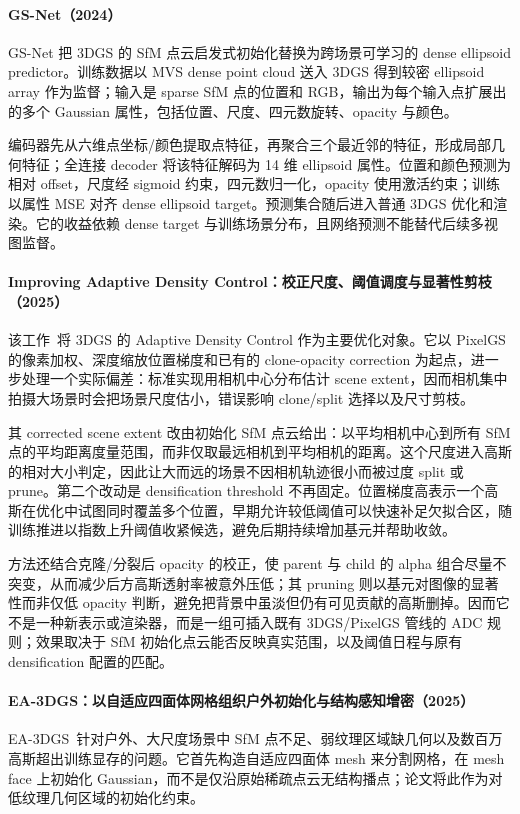 \paragraph{GS-Net（2024）\cite{2409_11307}}
GS-Net 把 3DGS 的 SfM 点云启发式初始化替换为跨场景可学习的 dense ellipsoid predictor。训练数据以 MVS dense point cloud 送入 3DGS 得到较密 ellipsoid array 作为监督；输入是 sparse SfM 点的位置和 RGB，输出为每个输入点扩展出的多个 Gaussian 属性，包括位置、尺度、四元数旋转、opacity 与颜色。

编码器先从六维点坐标/颜色提取点特征，再聚合三个最近邻的特征，形成局部几何特征；全连接 decoder 将该特征解码为 14 维 ellipsoid 属性。位置和颜色预测为相对 offset，尺度经 sigmoid 约束，四元数归一化，opacity 使用激活约束；训练以属性 MSE 对齐 dense ellipsoid target。预测集合随后进入普通 3DGS 优化和渲染。它的收益依赖 dense target 与训练场景分布，且网络预测不能替代后续多视图监督。

\paragraph{Improving Adaptive Density Control：校正尺度、阈值调度与显著性剪枝（2025）\cite{2503_14274}}
该工作~\cite{2503_14274}将 3DGS 的 Adaptive Density Control 作为主要优化对象。它以 PixelGS 的像素加权、深度缩放位置梯度和已有的 clone-opacity correction 为起点，进一步处理一个实际偏差：标准实现用相机中心分布估计 scene extent，因而相机集中拍摄大场景时会把场景尺度估小，错误影响 clone/split 选择以及尺寸剪枝。

其 corrected scene extent 改由初始化 SfM 点云给出：以平均相机中心到所有 SfM 点的平均距离度量范围，而非仅取最远相机到平均相机的距离。这个尺度进入高斯的相对大小判定，因此让大而远的场景不因相机轨迹很小而被过度 split 或 prune。第二个改动是 densification threshold 不再固定。位置梯度高表示一个高斯在优化中试图同时覆盖多个位置，早期允许较低阈值可以快速补足欠拟合区，随训练推进以指数上升阈值收紧候选，避免后期持续增加基元并帮助收敛。

方法还结合克隆/分裂后 opacity 的校正，使 parent 与 child 的 alpha 组合尽量不突变，从而减少后方高斯透射率被意外压低；其 pruning 则以基元对图像的显著性而非仅低 opacity 判断，避免把背景中虽淡但仍有可见贡献的高斯删掉。因而它不是一种新表示或渲染器，而是一组可插入既有 3DGS/PixelGS 管线的 ADC 规则；效果取决于 SfM 初始化点云能否反映真实范围，以及阈值日程与原有 densification 配置的匹配。

\paragraph{EA-3DGS：以自适应四面体网格组织户外初始化与结构感知增密（2025）\cite{2505_10787}}
EA-3DGS~\cite{2505_10787}针对户外、大尺度场景中 SfM 点不足、弱纹理区域缺几何以及数百万高斯超出训练显存的问题。它首先构造自适应四面体 mesh 来分割网格，在 mesh face 上初始化 Gaussian，而不是仅沿原始稀疏点云无结构播点；论文将此作为对低纹理几何区域的初始化约束。

